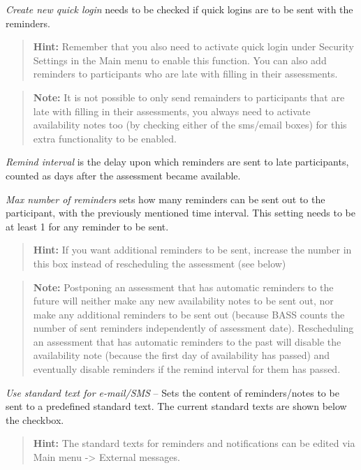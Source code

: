 \documentclass[]{book}
\begin{document}
\emph{Create new quick login} needs to be checked if quick logins are to be sent with the reminders.

\begin{quote}
\textbf{Hint:} Remember that you also need to activate quick login under Security Settings in the Main menu to enable this function.
You can also add reminders to participants who are late with filling in their assessments.
\end{quote}

\begin{quote}
\textbf{Note:} It is not possible to only send remainders to participants that are late with filling in their assessments, you always need to activate availability notes too (by checking either of the sms/email boxes) for this extra functionality to be enabled.
\end{quote}

\emph{Remind interval} is the delay upon which reminders are sent to late participants, counted as days after the assessment became available.

\emph{Max number of reminders} sets how many reminders can be sent out to the participant, with the previously mentioned time interval. This setting needs to be at least 1 for any reminder to be sent.

\begin{quote}
\textbf{Hint:} If you want additional reminders to be sent, increase the number in this box instead of rescheduling the assessment (see below)
\end{quote}

\begin{quote}
\textbf{Note:} Postponing an assessment that has automatic reminders to the future will neither make any new availability notes to be sent out, nor make any additional reminders to be sent out (because BASS counts the number of sent reminders independently of assessment date). Rescheduling an assessment that has automatic reminders to the past will disable the availability note (because the first day of availability has passed) and eventually disable reminders if the remind interval for them has passed.
\end{quote}

\emph{Use standard text for e-mail/SMS} -- Sets the content of reminders/notes to be sent to a predefined standard text. The current standard texts are shown below the checkbox.

\begin{quote}
\textbf{Hint:} The standard texts for reminders and notifications can be edited via Main menu -\textgreater{} External messages.
\end{quote}
\end{document}
